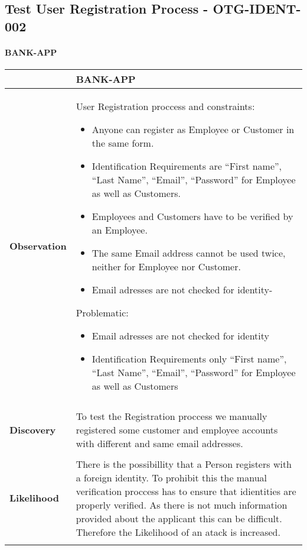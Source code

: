 \subsection{Test User Registration Process - OTG-IDENT-002}
\paragraph{BANK-APP} \mbox{}
\begin{longtable*}{p{.20\textwidth} | p{.80\textwidth}}
    \hline
    & \textbf{BANK-APP} \\ 
    \hline
    \textbf{Observation} &
        User Registration proccess and constraints:
		\begin{itemize}
		  \item Anyone can register as Employee or Customer in the same form.
		  \item Identification Requirements are \enquote{First name}, \enquote{Last Name}, \enquote{Email}, \enquote{Password} for Employee as well as Customers.
		  \item Employees and Customers have to be verified by an Employee.
		  \item The same Email address cannot be used twice, neither for Employee nor Customer.
		  \item Email adresses are not checked for identity-
		\end{itemize}
		Problematic:
		\begin{itemize}
		  \item Email adresses are not checked for identity
		  \item Identification Requirements only \enquote{First name}, \enquote{Last Name}, \enquote{Email}, \enquote{Password} for Employee as well as Customers
		\end{itemize}
    \\\\
    \textbf{Discovery} &
        To test the Registration proccess we manually registered some customer and employee accounts with different and same email addresses.
    \\\\
    \textbf{Likelihood} &
        There is the possibillity that a Person registers with a foreign identity. To prohibit this the manual verification proccess has to ensure that idientities are properly verified. As there is not much information provided about the applicant this can be difficult.
        Therefore the Likelihood of an atack is increased.
    \\\\

\end{longtable*}
